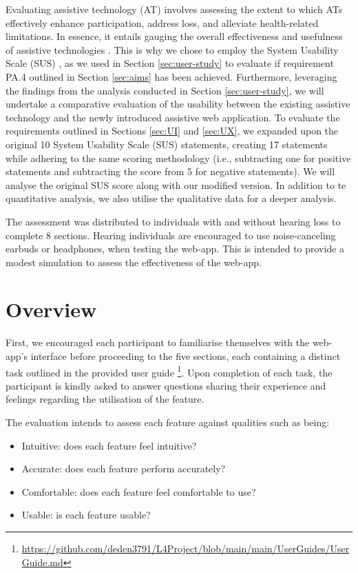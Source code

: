 \documentclass{l4proj}
\begin{document}
Evaluating assistive technology (AT) involves assessing the extent to which ATs effectively enhance participation, address loss, and alleviate health-related limitations. In essence, it entails gauging the overall effectiveness and usefulness of assistive technologies \citep{tao2020evaluation}. This is why we chose to employ the System Usability Scale (SUS) \citep{SUS}, as we used in Section \ref{sec:user-study} to evaluate if requirement PA.4 outlined in Section \ref{sec:aims} has been achieved. Furthermore, leveraging the findings from the analysis conducted in Section \ref{sec:user-study}, we will undertake a comparative evaluation of the usability between the existing assistive technology and the newly introduced assistive web application. To evaluate the requirements outlined in Sections \ref{sec:UI} and \ref{sec:UX}, we expanded upon the original 10 System Usability Scale (SUS) statements, creating 17 statements while adhering to the same scoring methodology (i.e., subtracting one for positive statements and subtracting the score from 5 for negative statements). We will analyse the original SUS score along with our modified version. In addition to te quantitative analysis, we also utilise the qualitative data for a deeper analysis.

The assessment was distributed to individuals with and without hearing loss to complete 8 sections. Hearing individuals are encouraged to use noise-canceling earbuds or headphones, when testing the web-app. This is intended to provide a modest simulation to assess the effectiveness of the web-app.

\section{Overview}

First, we encouraged each participant to familiarise themselves with the web-app's interface before proceeding to the five sections, each containing a distinct task outlined in the provided user guide \footnote{\url{https://github.com/deden3791/L4Project/blob/main/main/UserGuides/UserGuide.md}}. Upon completion of each task, the participant is kindly asked to answer questions sharing their experience and feelings regarding the utilisation of the feature.

The evaluation intends to assess each feature against qualities such as being:

\begin{itemize}
    \item Intuitive: does each feature feel intuitive?
    \item Accurate: does each feature perform accurately?
    \item Comfortable: does each feature feel comfortable to use?
    \item Usable: is each feature usable?
\end{itemize}
\end{document}

